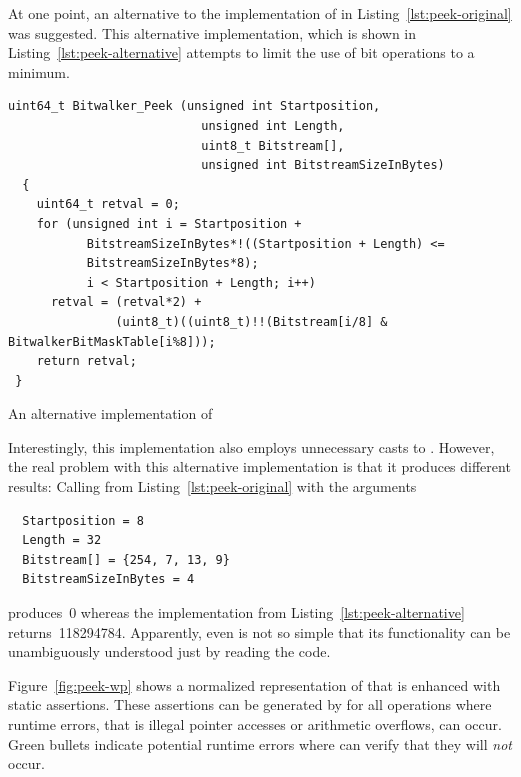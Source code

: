 At one point, an alternative to the implementation of \peek in
Listing~\ref{lst:peek-original} was suggested.
This alternative implementation, which is shown in Listing~\ref{lst:peek-alternative}
attempts to limit the use of bit operations to a minimum.


\begin{listing}[hbt]
\begin{minipage}{\textwidth}
\begin{lstlisting}[style=acsl-block,frame=single]
  uint64_t Bitwalker_Peek (unsigned int Startposition,
                           unsigned int Length,
                           uint8_t Bitstream[],
                           unsigned int BitstreamSizeInBytes)
  {
    uint64_t retval = 0;
    for (unsigned int i = Startposition +
           BitstreamSizeInBytes*!((Startposition + Length) <=
           BitstreamSizeInBytes*8);
           i < Startposition + Length; i++)
      retval = (retval*2) +
               (uint8_t)((uint8_t)!!(Bitstream[i/8] & BitwalkerBitMaskTable[i%8]));
    return retval;
 }
\end{lstlisting}
\end{minipage}
\caption{\label{lst:peek-alternative} An alternative implementation of \peek}
\end{listing}

Interestingly, this implementation also employs unnecessary casts to .
However, the real problem with this alternative implementation is that it produces
different results: Calling \peek from Listing~\ref{lst:peek-original} with the arguments

\begin{verbatim}
  Startposition = 8
  Length = 32
  Bitstream[] = {254, 7, 13, 9}
  BitstreamSizeInBytes = 4
\end{verbatim}

produces~0 whereas the implementation from Listing~\ref{lst:peek-alternative} returns~118294784.
Apparently, even \peek is not so simple that its functionality can be unambiguously
understood just by reading the code.


\clearpage

Figure~\ref{fig:peek-wp} shows a normalized representation of \peek
that is enhanced with static \acsl assertions.
These assertions can be generated by \framac for all operations where
runtime errors, that is illegal pointer accesses or arithmetic overflows, can occur.
Green bullets indicate potential runtime errors where \framacwp can verify
that they will \emph{not} occur.


